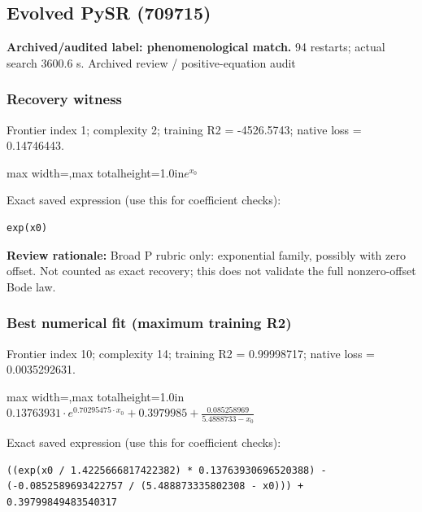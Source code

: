 \documentclass[10pt,letterpaper,landscape]{article}
\begin{document}
\begin{minipage}[t]{0.485\textwidth}
\subsection*{Evolved PySR (709715)}
\textbf{Archived/audited label: phenomenological match.} 94 restarts; actual search 3600.6 s.
{\small Archived review / positive-equation audit}
\subsubsection*{Recovery witness}
Frontier index 1; complexity 2; training R2 = -4526.5743; native loss = 0.14746443.
\begin{center}\begin{adjustbox}{max width=\linewidth,max totalheight=1.0in}$\displaystyle e^{x_{0}}$\end{adjustbox}\end{center}
{\scriptsize Exact saved expression (use this for coefficient checks):}
\begin{lstlisting}
exp(x0)
\end{lstlisting}
{\small\textbf{Review rationale:} Broad P rubric only: exponential family, possibly with zero offset. Not counted as exact recovery; this does not validate the full nonzero-offset Bode law.}
\subsubsection*{Best numerical fit (maximum training R2)}
Frontier index 10; complexity 14; training R2 = 0.99998717; native loss = 0.0035292631.
\begin{center}\begin{adjustbox}{max width=\linewidth,max totalheight=1.0in}$\displaystyle 0.13763931 \cdot e^{0.70295475 \cdot x_{0}} + 0.3979985 + \frac{0.085258969}{5.4888733 - x_{0}}$\end{adjustbox}\end{center}
{\scriptsize Exact saved expression (use this for coefficient checks):}
\begin{lstlisting}
((exp(x0 / 1.4225666817422382) * 0.13763930696520388) - (-0.0852589693422757 / (5.488873335802308 - x0))) + 0.39799849483540317
\end{lstlisting}
\end{minipage}
\clearpage{}\label{bode-10007}
\end{document}
